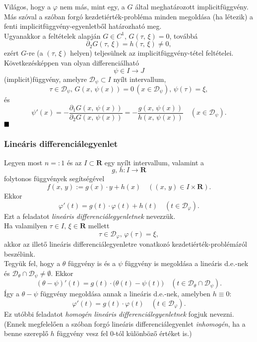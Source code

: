 \documentclass{article}
\newcommand{\R}{\mathbf{R}}
\newcommand{\Dp}{\mathcal{D}_\varphi}
\begin{document}
	Világos, hogy a $\varphi$ nem más, mint egy, a $G$ által meghatározott implicitfüggvény. Más szóval a szóban forgó kezdetiérték-probléma minden megoldása (ha létezik) a fenti implicitfüggvény-egyenletből határozható meg. \\
	
	Ugyanakkor a feltételek alapján $G \in C^1, \, G(\tau, \, \xi) = 0$, továbbá
	\[
		\partial_2 G(\tau, \, \xi) = h(\tau, \, \xi) \neq 0,
	\]
	ezért $G$-re (a $(\tau, \, \xi)$ helyen) teljesülnek az implicitfüggvény-tétel feltételei. Következésképpen van olyan differenciálható
	\[
		\psi \in I \to J
	\]
	(implicit)függvény, amelyre $\mathcal{D}_\psi \subset I$ nyílt intervallum,
	\[
		\tau \in \mathcal{D}_\psi, \, G(x, \, \psi(x)) = 0 \, (x \in \mathcal{D}_\psi), \, \psi(\tau) = \xi,
	\]
	és
	\[
		\psi'(x) = - \frac{\partial_1 G(x, \, \psi(x))}{\partial_2 G(x, \, \psi(x))} = - \frac{g(x, \, \psi(x))}{h(x, \, \psi(x))} \quad (x \in \mathcal{D}_\psi).
	\]
	$\hfill\blacksquare$
	
	
	
	
	\subsubsection{Lineáris differenciálegyenlet}
	Legyen most $n =: 1$ és az $I \subset \R$ egy nyílt intervallum, valamint a
	\[
		g, \, h : I \to \R
	\]
	folytonos függvények segítségével
	\[
		f(x, \, y) := g(x) \cdot y + h(x) \quad ((x, \, y) \in I \times \R).
	\]
	Ekkor
	\[
		\varphi'(t) = g(t) \cdot \varphi(t) + h(t) \quad (t \in \Dp).
	\]
	Ezt a feladatot \textit{lineáris differenciálegyenletnek} nevezzük. \\
	
	Ha valamilyen $\tau \in I, \, \xi \in \R$ mellett
	\[
		\tau \in \Dp, \, \varphi(\tau) = \xi,
	\]
	akkor az illető lineáris differenciálegyenletre vonatkozó kezdetiérték-problémáról beszélünk.\\
	
	Tegyük fel, hogy a $\theta$ függvény is és a $\psi$ függvény is megoldása a lineáris d.e.-nek és $\mathcal{D}_\theta \cap \mathcal{D}_\psi \neq \emptyset$. Ekkor
	\[
		(\theta - \psi)'(t) = g(t) \cdot \big( \theta(t) - \psi(t) \big) \quad (t \in \mathcal{D}_\theta \cap \mathcal{D}_\psi).
	\]
	Így a $\theta - \psi$ függvény megoldása annak a lineáris d.e.-nek, amelyben $h \equiv 0$:
	\[
		\varphi'(t) = g(t) \cdot \varphi(t) \quad (t \in \Dp).
	\]
	Ez utóbbi feladatot \textit{homogén lineáris differenciálegyenletnek} fogjuk nevezni. (Ennek megfelelően a szóban forgó lineáris differenciálegyenlet \textit{inhomogén}, ha a benne szereplő $h$ függvény vesz fel 0-tól különböző értéket is.)\\
	
\end{document}
